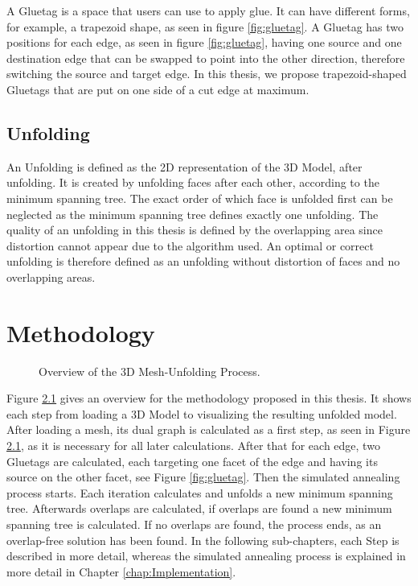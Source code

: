 \documentclass[draft,final]{vutinfth} %
\begin{document}
A Gluetag is a space that users can use to apply glue. It can have different forms, for example, a trapezoid shape, as seen in figure \ref{fig:gluetag}. A Gluetag has two positions for each edge, as seen in figure \ref{fig:gluetag}, having one source and one destination edge that can be swapped to point into the other direction, therefore switching the source and target edge. In this thesis, we propose trapezoid-shaped Gluetags that are put on one side of a cut edge at maximum.

\section{Unfolding}
An Unfolding is defined as the 2D representation of the 3D Model, after unfolding. It is created by unfolding faces after each other, according to the minimum spanning tree. The exact order of which face is unfolded first can be neglected as the minimum spanning tree defines exactly one unfolding. The quality of an unfolding in this thesis is defined by the overlapping area since distortion cannot appear due to the algorithm used. An optimal or correct unfolding is therefore defined as an unfolding without distortion of faces and no overlapping areas. 

\chapter{Methodology}
\label{chap:methodology}

\begin{figure}

\caption{Overview of the 3D Mesh-Unfolding Process.}
\label{fig:overview}
\end{figure}

Figure \ref{fig:overview} gives an overview for the methodology proposed in this thesis. It shows each step from loading a 3D Model to visualizing the resulting unfolded model. After loading a mesh, its dual graph is calculated as a first step, as seen in Figure \ref{fig:overview}, as it is necessary for all later calculations. After that for each edge, two Gluetags are calculated, each targeting one facet of the edge and having its source on the other facet, see Figure \ref{fig:gluetag}. Then the simulated annealing process starts. Each iteration calculates and unfolds a new minimum spanning tree. Afterwards overlaps are calculated, if overlaps are found a new minimum spanning tree is calculated. If no overlaps are found, the process ends, as an overlap-free solution has been found. In the following sub-chapters, each Step is described in more detail, whereas the simulated annealing process is explained in more detail in Chapter \ref{chap:Implementation}.
\end{document}
